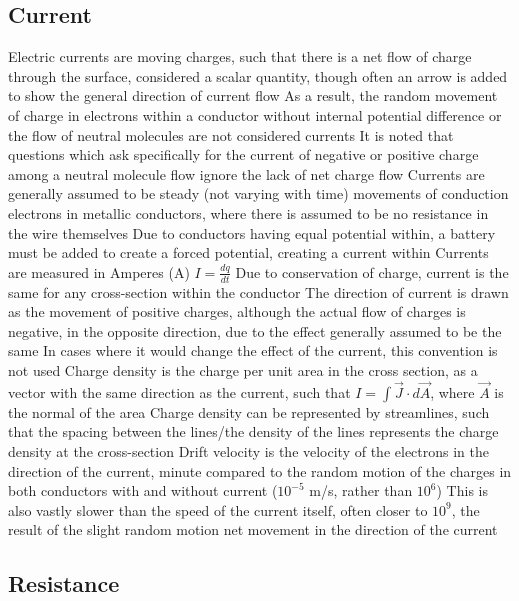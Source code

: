 \documentclass[11 pt, twoside]{article}
\newenvironment{outline*}
{
	\begin{outline}[enumerate]
	}
	{\end{outline}
}
\begin{document}
\subsection{Current}
\begin{outline*}
\1 Electric currents are moving charges, such that there is a net flow of charge through the surface, considered a scalar quantity, though often an arrow is added to show the general direction of current flow
\2 As a result, the random movement of charge in electrons within a conductor without internal potential difference or the flow of neutral molecules are not considered currents
\3 It is noted that questions which ask specifically for the current of negative or positive charge among a neutral molecule flow ignore the lack of net charge flow
\2 Currents are generally assumed to be steady (not varying with time) movements of conduction electrons in metallic conductors, where there is assumed to be no resistance in the wire themselves
\3 Due to conductors having equal potential within, a battery must be added to create a forced potential, creating a current within
\2 Currents are measured in Amperes (A)
\2 $I = \frac{dq}{dt}$
\1 Due to conservation of charge, current is the same for any cross-section within the conductor
\1 The direction of current is drawn as the movement of positive charges, although the actual flow of charges is negative, in the opposite direction, due to the effect generally assumed to be the same
\2 In cases where it would change the effect of the current, this convention is not used
\1 Charge density is the charge per unit area in the cross section, as a vector with the same direction as the current, such that $I = \int \vec{J} \cdot d\vec{A}$, where $\vec{A}$ is the normal of the area
\2 Charge density can be represented by streamlines, such that the spacing between the lines/the density of the lines represents the charge density at the cross-section
\1 Drift velocity is the velocity of the electrons in the direction of the current, minute compared to the random motion of the charges in both conductors with and without current ($10^{-5}$ m/s, rather than $10^6$)
\2 This is also vastly slower than the speed of the current itself, often closer to $10^9$, the result of the slight random motion net movement in the direction of the current
\2 
\end{outline*}

\subsection{Resistance}
\begin{outline*}

\end{outline*}
\end{document}
